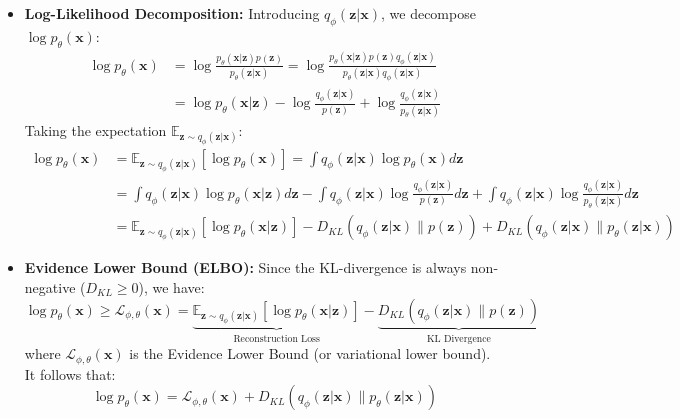 \documentclass[UTF8]{ctexart}
\begin{document}
\begin{itemize}
    \item \textbf{Log-Likelihood Decomposition:} Introducing $q_\phi(\mathbf{z}|\mathbf{x})$, we decompose $\log p_\theta(\mathbf{x})$:
    \begin{align*}
        \log p_\theta(\mathbf{x}) &= \log \frac{p_\theta(\mathbf{x}|\mathbf{z})p(\mathbf{z})}{p_\theta(\mathbf{z}|\mathbf{x})} = \log \frac{p_\theta(\mathbf{x}|\mathbf{z})p(\mathbf{z})q_\phi(\mathbf{z}|\mathbf{x})}{p_\theta(\mathbf{z}|\mathbf{x})q_\phi(\mathbf{z}|\mathbf{x})} \\
        &= \log p_\theta(\mathbf{x}|\mathbf{z}) - \log \frac{q_\phi(\mathbf{z}|\mathbf{x})}{p(\mathbf{z})} + \log \frac{q_\phi(\mathbf{z}|\mathbf{x})}{p_\theta(\mathbf{z}|\mathbf{x})}
    \end{align*}
    Taking the expectation $\mathbb{E}_{\mathbf{z} \sim q_\phi(\mathbf{z}|\mathbf{x})}$:
    \begin{align*}
        \log p_\theta(\mathbf{x}) &= \mathbb{E}_{\mathbf{z} \sim q_\phi(\mathbf{z}|\mathbf{x})}[\log p_\theta(\mathbf{x})] = \int q_\phi(\mathbf{z}|\mathbf{x}) \log p_\theta(\mathbf{x}) d\mathbf{z} \\
        &= \int q_\phi(\mathbf{z}|\mathbf{x}) \log p_\theta(\mathbf{x}|\mathbf{z}) d\mathbf{z} - \int q_\phi(\mathbf{z}|\mathbf{x}) \log \frac{q_\phi(\mathbf{z}|\mathbf{x})}{p(\mathbf{z})} d\mathbf{z} + \int q_\phi(\mathbf{z}|\mathbf{x}) \log \frac{q_\phi(\mathbf{z}|\mathbf{x})}{p_\theta(\mathbf{z}|\mathbf{x})} d\mathbf{z} \\
        &= \mathbb{E}_{\mathbf{z} \sim q_\phi(\mathbf{z}|\mathbf{x})}[\log p_\theta(\mathbf{x}|\mathbf{z})] - D_{KL}(q_\phi(\mathbf{z}|\mathbf{x}) \| p(\mathbf{z})) + D_{KL}(q_\phi(\mathbf{z}|\mathbf{x}) \| p_\theta(\mathbf{z}|\mathbf{x}))
    \end{align*}

    \item \textbf{Evidence Lower Bound (ELBO):} Since the KL-divergence is always non-negative ($D_{KL} \ge 0$), we have:
    $$\log p_\theta(\mathbf{x}) \ge \mathcal{L}_{\phi, \theta}(\mathbf{x}) = \underbrace{\mathbb{E}_{\mathbf{z} \sim q_\phi(\mathbf{z}|\mathbf{x})}[\log p_\theta(\mathbf{x}|\mathbf{z})]}_{\text{Reconstruction Loss}} - \underbrace{D_{KL}(q_\phi(\mathbf{z}|\mathbf{x}) \| p(\mathbf{z}))}_{\text{KL Divergence}}$$
    where $\mathcal{L}_{\phi, \theta}(\mathbf{x})$ is the Evidence Lower Bound (or variational lower bound). It follows that:
    $$\log p_\theta(\mathbf{x}) = \mathcal{L}_{\phi, \theta}(\mathbf{x}) + D_{KL}(q_\phi(\mathbf{z}|\mathbf{x}) \| p_\theta(\mathbf{z}|\mathbf{x}))$$
    

\end{itemize}
\end{document}
